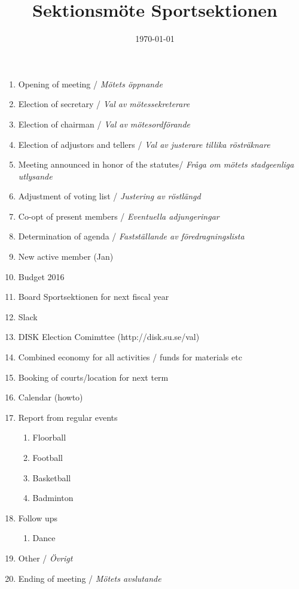\documentclass[12pt,a4paper]{article}
\begin{document}
	\title{\Huge Sektionsmöte Sportsektionen}
	\date{\today}
	\maketitle

	\null
	\vfill

	\clearpage

	\begin{enumerate}

		\item Opening of meeting / \emph{Mötets öppnande}
		\item Election of secretary / \emph{Val av mötessekreterare}
		\item Election of chairman / \emph{Val av mötesordförande}
		\item Election of adjustors and tellers / \emph{Val av justerare tillika rösträknare}
		\item Meeting announced in honor of the statutes/ \emph{Fråga om mötets stadgeenliga utlysande}
		\item Adjustment of voting list / \emph{Justering av röstlängd}
		\item Co-opt of present members / \emph{Eventuella adjungeringar}
		\item Determination of agenda / \emph{Fastställande av föredragningslista}

		\item New active member (Jan)
		\item Budget 2016
		\item Board Sportsektionen for next fiscal year
		\item Slack
		\item DISK Election Comimttee (http://disk.su.se/val)
		\item Combined economy for all activities / funds for materials etc
		\item Booking of courts/location for next term
		\item Calendar (howto)

		\item Report from regular events
		\begin{enumerate}
			\item Floorball
			\item Football
			\item Basketball
			\item Badminton
		\end{enumerate}
		\item Follow ups %
		\begin{enumerate}
			\item Dance
		\end{enumerate}
		\item Other / \emph{Övrigt}
		\item Ending of meeting / \emph{Mötets avslutande}
	\end{enumerate}
\end{document}

